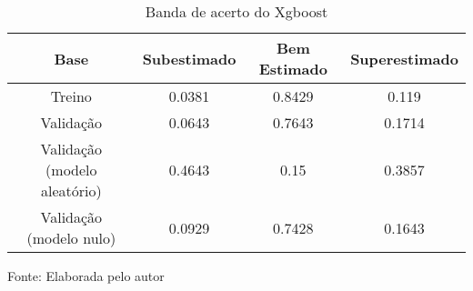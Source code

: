 
\begin{table}[h]
\centering
\caption{Banda de acerto do Xgboost}
\label{tab:cap3_band_xgboost}
\begin{tabular}{cccc}
Base & Subestimado & Bem Estimado & Superestimado \\
\hline
Treino & 0.0381 & 0.8429 & 0.119 \\
Validação & 0.0643 & 0.7643 & 0.1714 \\
Validação (modelo aleatório) & 0.4643 & 0.15 & 0.3857 \\
Validação (modelo nulo) & 0.0929 & 0.7428 & 0.1643 \\
\hline
\end{tabular}

Fonte: Elaborada pelo autor
\end{table}
